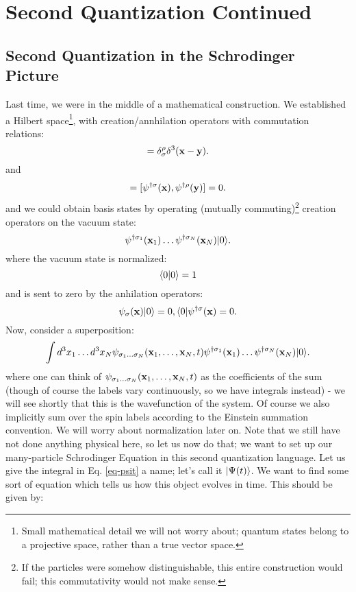 \section{Second Quantization Continued}
\subsection{Second Quantization in the Schrodinger Picture}
Last time, we were in the middle of a mathematical construction. We established a Hilbert space\footnote{Small mathematical detail we will not worry about; quantum states belong to a projective space, rather than a true vector space.}, with creation/annhilation operators with commutation relations:
\begin{equation}
    [\psi_\sigma(\v{x}), \psi^{\dag\rho}(\v{y})] = \delta_\sigma^\rho \delta^3(\v{x} - \v{y}).
\end{equation}
and
\begin{equation}
    [\psi_\sigma(\v{x}), \psi_{\rho}(\v{y})] = [\psi^{\dag \sigma}(\v{x}), \psi^{\dag\rho}(\v{y})] = 0.
\end{equation}
and we could obtain basis states by operating (mutually commuting)\footnote{If the particles were somehow distinguishable, this entire construction would fail; this commutativity would not make sense.} creation operators on the vacuum state:
\begin{equation}
    \psi^{\dagger\sigma_1}(\mathbf{x}_1)\ldots\psi^{\dagger\sigma_N}(\mathbf{x}_N)\lvert 0 \rangle.
\end{equation}
where the vacuum state is normalized:
\begin{equation}
    \langle 0 \lvert 0 \rangle = 1
\end{equation}
and is sent to zero by the anhilation operators:
\begin{equation}
    \psi_\sigma(\mathbf{x})\lvert 0 \rangle = 0, \langle 0 \rvert\psi^{\dagger\sigma}(\mathbf{x}) = 0.
\end{equation}
Now, consider a superposition:
\begin{equation}\label{eq-psit}
    \int d^3x_1 \ldots d^3x_N \psi_{\sigma_1\ldots \sigma_N}(\mathbf{x}_1, \ldots, \mathbf{x}_N, t)\psi^{\dagger\sigma_{1}}(\mathbf{x}_1)\ldots\psi^{\dagger\sigma_N}(\mathbf{x}_N)\lvert 0 \rangle.
\end{equation}
where one can think of $\psi_{\sigma_1\ldots \sigma_N}(\mathbf{x}_1, \ldots, \mathbf{x}_N, t)$ as the coefficients of the sum (though of course the labels vary continuously, so we have integrals instead) - we will see shortly that this is the wavefunction of the system. Of course we also implicitly sum over the spin labels according to the Einstein summation convention. We will worry about normalization later on. Note that we still have not done anything physical here, so let us now do that; we want to set up our many-particle Schrodinger Equation in this second quantization language. Let us give the integral in Eq. \eqref{eq-psit} a name; let's call it $\lvert \Psi(t) \rangle$. We want to find some sort of equation which tells us how this object evolves in time. This should be given by:
